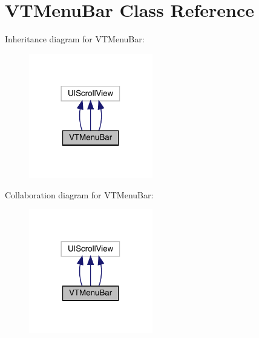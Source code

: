 \hypertarget{interface_v_t_menu_bar}{}\section{V\+T\+Menu\+Bar Class Reference}
\label{interface_v_t_menu_bar}


Inheritance diagram for V\+T\+Menu\+Bar\+:\nopagebreak
\begin{figure}[H]
\begin{center}
\leavevmode
\includegraphics[width=153pt]{interface_v_t_menu_bar__inherit__graph}
\end{center}
\end{figure}


Collaboration diagram for V\+T\+Menu\+Bar\+:\nopagebreak
\begin{figure}[H]
\begin{center}
\leavevmode
\includegraphics[width=153pt]{interface_v_t_menu_bar__coll__graph}
\end{center}
\end{figure}
